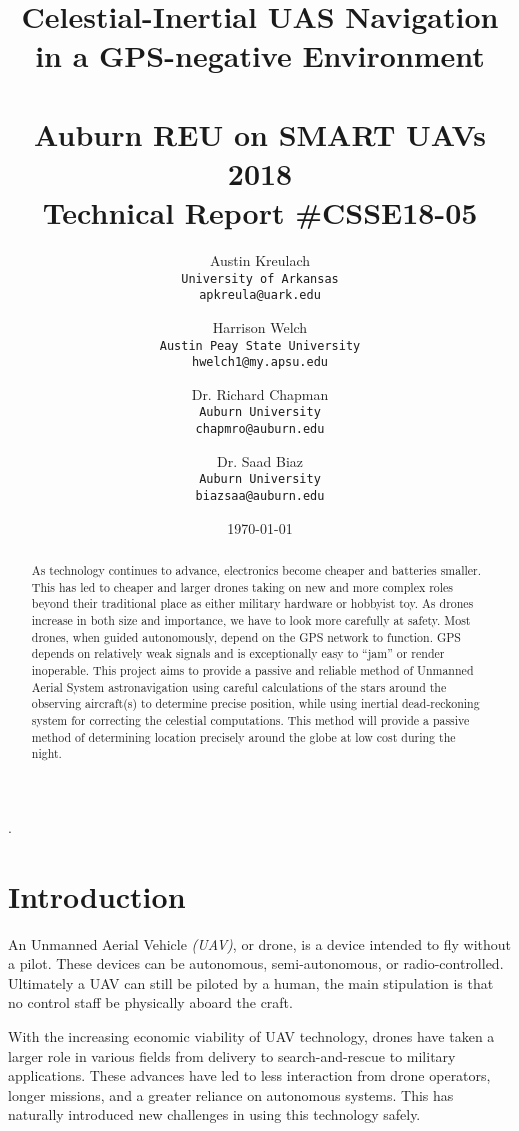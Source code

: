 \documentclass[]{article}
\title{\huge Celestial-Inertial UAS Navigation in a GPS-negative Environment\\\tiny ~\\
        \large Auburn REU on SMART UAVs 2018\\
        \large Technical Report \#CSSE18-05}
\author{
  Austin Kreulach\\
  \texttt{University of Arkansas}\\
  \texttt{apkreula@uark.edu}
  \and
  Harrison Welch\\
  \texttt{Austin Peay State University}\\
  \texttt{hwelch1@my.apsu.edu}
  \and
  Dr. Richard Chapman\\
  \texttt{Auburn University}\\
  \texttt{chapmro@auburn.edu}
  \and
  Dr. Saad Biaz\\
  \texttt{Auburn University}\\
  \texttt{biazsaa@auburn.edu}
  }
\date{\today}
\begin{document}
\maketitle

\begin{abstract}
	As technology continues to advance, electronics become cheaper and batteries smaller. This has led to cheaper and larger drones taking on new and more complex roles beyond their traditional place as either military hardware or hobbyist toy. As drones increase in both size and importance, we have to look more carefully at safety. Most drones, when guided autonomously, depend on the GPS network to function. GPS depends on relatively weak signals and is exceptionally easy to “jam” or render inoperable. This project aims to provide a passive and reliable method of Unmanned Aerial System astronavigation using careful calculations of the stars around the observing aircraft(s) to determine precise position, while using inertial dead-reckoning system for correcting the celestial computations. This method will provide a passive method of determining location precisely around the globe at low cost during the night.
\end{abstract}.

\section{Introduction}

    \begin{comment}
            Dr. Biaz's general recommendations
            7) Do not put dry numbers as references, accompany the citations with the names of the authors.
    \end{comment}
    
    An Unmanned Aerial Vehicle \emph{(UAV)}, or drone, is a device intended to fly without a pilot. These devices can be autonomous, semi-autonomous, or radio-controlled. Ultimately a UAV can still be piloted by a human, the main stipulation is that no control staff be physically aboard the craft.\newline
    
    With the increasing economic viability of UAV technology, drones have taken a larger role in various fields from delivery to search-and-rescue to military applications. These advances have led to less interaction from drone operators, longer missions, and a greater reliance on autonomous systems. This has naturally introduced new challenges in using this technology safely.\newline
    
\end{document}
